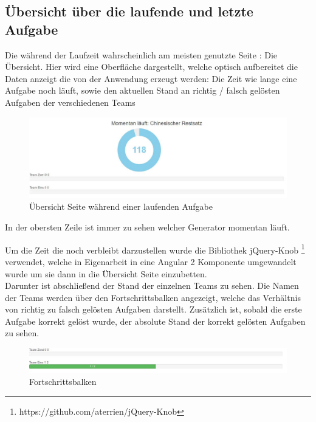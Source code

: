 \subsection{Übersicht über die laufende und letzte Aufgabe}

Die während der Laufzeit wahrscheinlich am meisten genutzte Seite : Die Übersicht. Hier wird eine Oberfläche dargestellt, welche optisch aufbereitet die Daten anzeigt die von der Anwendung erzeugt werden: Die Zeit wie lange eine Aufgabe noch läuft, sowie den aktuellen Stand an richtig / falsch gelösten Aufgaben der verschiedenen Teams \\
\begin{figure}[htp]     %
\centering
\includegraphics[width=1\textwidth]{bilder/Overview} 
\caption[Übersicht Seite während einer laufenden Aufgabe]{Übersicht Seite während einer laufenden Aufgabe}
\end{figure} 
In der obersten Zeile ist immer zu sehen welcher Generator momentan läuft.

Um die Zeit die noch verbleibt darzustellen wurde die Bibliothek jQuery-Knob \footnote{https://github.com/aterrien/jQuery-Knob} verwendet, welche in Eigenarbeit in eine Angular 2 Komponente umgewandelt wurde um sie dann in die Übersicht Seite einzubetten. \\

Darunter ist abschließend der Stand der einzelnen Teams zu sehen. Die Namen der Teams werden über den Fortschrittsbalken angezeigt, welche das Verhältnis von richtig zu falsch gelösten Aufgaben darstellt. Zusätzlich ist, sobald die erste Aufgabe korrekt gelöst wurde, der absolute Stand der korrekt gelösten Aufgaben zu sehen. \\

\begin{figure}[htp]     %
\centering
\includegraphics[width=1\textwidth]{bilder/Bars} 
\caption[Fortschrittsbalken]{Fortschrittsbalken}
\end{figure} 

